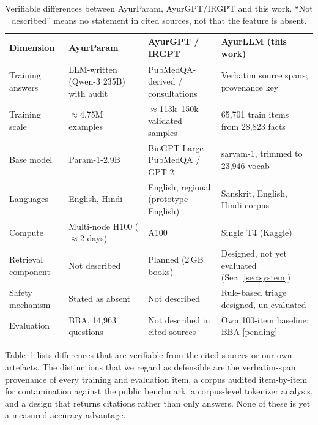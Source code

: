 \documentclass[10pt,twocolumn,letterpaper]{article}
\begin{document}
\begin{table}[t]
\centering
\small
\setlength{\tabcolsep}{4pt}
\begin{tabular}{@{}llll@{}}
\toprule
\textbf{Dimension} & \textbf{AyurParam~\cite{ayurparam}} & \textbf{AyurGPT / IRGPT~\cite{ayurgpt,ayurnlp}} & \textbf{AyurLLM (this work)} \\
\midrule
Training answers     & LLM-written (Qwen-3 235B) with audit & PubMedQA-derived / consultations & Verbatim source spans; provenance key \\
Training scale       & $\approx$4.75M examples              & $\approx$113k--150k validated samples & 65{,}701 train items from 28{,}823 facts \\
Base model           & Param-1-2.9B                         & BioGPT-Large-PubMedQA / GPT-2 & sarvam-1, trimmed to 23{,}946 vocab \\
Languages            & English, Hindi                       & English, regional (prototype English) & Sanskrit, English, Hindi corpus \\
Compute              & Multi-node H100 ($\approx$2 days)    & A100                          & Single T4 (Kaggle) \\
Retrieval component  & Not described                        & Planned (2\,GB books)         & Designed, not yet evaluated (Sec.~\ref{sec:system}) \\
Safety mechanism     & Stated as absent                     & Not described                 & Rule-based triage designed, un-evaluated \\
Evaluation           & BBA, 14{,}963 questions              & Not described in cited sources & Own 100-item baseline; BBA [pending] \\
\bottomrule
\end{tabular}
\caption{Verifiable differences between AyurParam, AyurGPT/IRGPT and this work.
``Not described'' means no statement in cited sources, not that the feature is absent.}
\label{tab:positioning}
\end{table}

Table~\ref{tab:positioning} lists differences that are verifiable from the cited
sources or our own artefacts. The distinctions that we regard as defensible are
the verbatim-span provenance of every training and evaluation item, a corpus
audited item-by-item for contamination against the public benchmark, a
corpus-level tokenizer analysis, and a design that returns citations rather than
only answers. None of these is yet a measured accuracy advantage.
\end{document}
